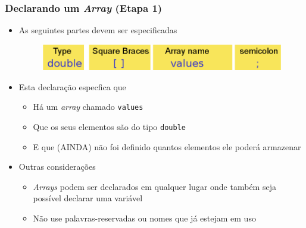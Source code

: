 \documentclass[xcolor={dvipsnames,table},aspectratio=169]{beamer}
\begin{document}
\begin{frame}\frametitle{Declarando um \emph{Array} (Etapa 1)}
\begin{itemize}
	\item As seguintes partes devem ser especificadas
\begin{figure}[h]
	\includegraphics[height=0.10\paperheight,center]{pucrs-ep-fprog-unidade_06-arrays-laminas-declaracao_etapa_1.png}
\end{figure}
	\item Esta declaração especfica que
	\begin{itemize}
		\item Há um \emph{array} chamado \texttt{values}
		\item Que os seus elementos são do tipo \texttt{double}
		\item E que (AINDA) não foi definido quantos elementos ele poderá armazenar
	\end{itemize}
	\item Outras considerações
	\begin{itemize}
		\item \emph{Arrays} podem ser declarados  em qualquer lugar onde também seja possível declarar uma variável
		\item Não use palavras-reservadas ou nomes que já estejam em uso
	\end{itemize}
\end{itemize}
\end{frame}
\end{document}
